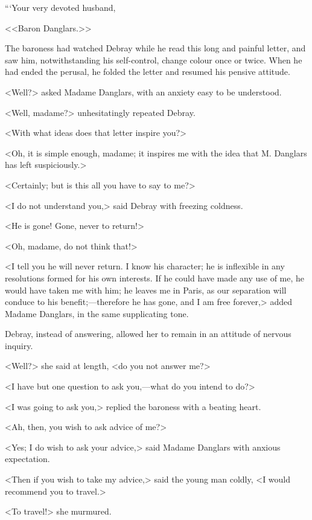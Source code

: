 “‘Your very devoted husband, 

 <<Baron Danglars.>> 

 The baroness had watched Debray while he read this long and painful letter, and saw him, notwithstanding his self-control, change colour once or twice. When he had ended the perusal, he folded the letter and resumed his pensive attitude. 

 <Well?> asked Madame Danglars, with an anxiety easy to be understood. 

 <Well, madame?> unhesitatingly repeated Debray. 

 <With what ideas does that letter inspire you?> 

 <Oh, it is simple enough, madame; it inspires me with the idea that M. Danglars has left suspiciously.> 

 <Certainly; but is this all you have to say to me?> 

 <I do not understand you,> said Debray with freezing coldness. 

 <He is gone! Gone, never to return!> 

 <Oh, madame, do not think that!> 

 <I tell you he will never return. I know his character; he is inflexible in any resolutions formed for his own interests. If he could have made any use of me, he would have taken me with him; he leaves me in Paris, as our separation will conduce to his benefit;—therefore he has gone, and I am free forever,> added Madame Danglars, in the same supplicating tone. 

 Debray, instead of answering, allowed her to remain in an attitude of nervous inquiry. 

 <Well?> she said at length, <do you not answer me?> 

 <I have but one question to ask you,—what do you intend to do?> 

 <I was going to ask you,> replied the baroness with a beating heart. 

 <Ah, then, you wish to ask advice of me?> 

 <Yes; I do wish to ask your advice,> said Madame Danglars with anxious expectation. 

 <Then if you wish to take my advice,> said the young man coldly, <I would recommend you to travel.> 

 <To travel!> she murmured. 

